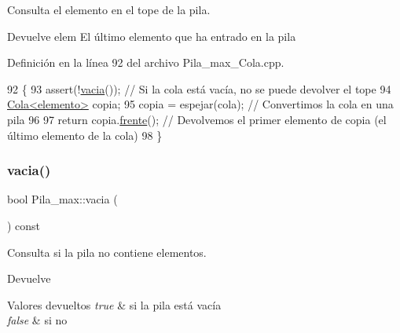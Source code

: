 Consulta el elemento en el tope de la pila. 

\begin{DoxyReturn}{Devuelve}
elem El último elemento que ha entrado en la pila 
\end{DoxyReturn}


Definición en la línea 92 del archivo Pila\+\_\+max\+\_\+\+Cola.\+cpp.


\begin{DoxyCode}
92                        \{                        
93     assert(!\hyperlink{classPila__max_a4b5784d89db4908b84a4ece46bc179fb}{vacia}());                                                           \textcolor{comment}{// Si la cola está
       vacía, no se puede devolver el tope}
94     \hyperlink{classCola}{Cola<elemento>} copia;
95     copia = espejar(cola);                                                      \textcolor{comment}{// Convertimos la cola en
       una pila}
96 
97     \textcolor{keywordflow}{return} copia.\hyperlink{classCola_a1df4ad2b50116ef22e77ad3f77b02d29}{frente}();                                                      \textcolor{comment}{// Devolvemos el
       primer elemento de copia (el último elemento de la cola)}
98 \}
\end{DoxyCode}
\mbox{\label{classPila__max_a4b5784d89db4908b84a4ece46bc179fb}} 
\subsubsection{\texorpdfstring{vacia()}{vacia()}\hspace{0.1cm}{\footnotesize\ttfamily [1/2]}}
{\footnotesize\ttfamily bool Pila\+\_\+max\+::vacia (\begin{DoxyParamCaption}{ }\end{DoxyParamCaption}) const}



Consulta si la pila no contiene elementos. 

\begin{DoxyReturn}{Devuelve}

\end{DoxyReturn}

\begin{DoxyRetVals}{Valores devueltos}
{\em true} & si la pila está vacía \\
\hline
{\em false} & si no \\
\hline
\end{DoxyRetVals}
\mbox{\label{classPila__max_a4b5784d89db4908b84a4ece46bc179fb}} 
